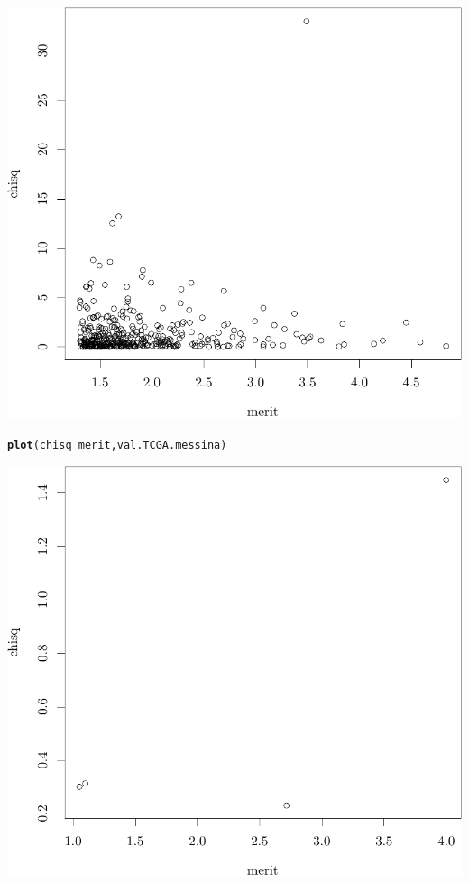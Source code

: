 \documentclass{article}\usepackage[]{graphicx}\usepackage[]{color}
\makeatletter
\def\maxwidth{ %
  \ifdim\Gin@nat@width>\linewidth
    \linewidth
  \else
    \Gin@nat@width
  \fi
}
\newcommand{\hlopt}[1]{\textcolor[rgb]{0,0,0}{#1}}%
\newcommand{\hlstd}[1]{\textcolor[rgb]{0.345,0.345,0.345}{#1}}%
\newcommand{\hlkwd}[1]{\textcolor[rgb]{0.737,0.353,0.396}{\textbf{#1}}}%
\newenvironment{kframe}{%
 \def\at@end@of@kframe{}%
 \ifinner\ifhmode%
  \def\at@end@of@kframe{\end{minipage}}%
  \begin{minipage}{\columnwidth}%
 \fi\fi%
 \def\FrameCommand##1{\hskip\@totalleftmargin \hskip-\fboxsep
 \colorbox{shadecolor}{##1}\hskip-\fboxsep
     \hskip-\linewidth \hskip-\@totalleftmargin \hskip\columnwidth}%
 \MakeFramed {\advance\hsize-\width
   \@totalleftmargin\z@ \linewidth\hsize
   \@setminipage}}%
 {\par\unskip\endMakeFramed%
 \at@end@of@kframe}
\newenvironment{knitrout}{}{} %
\makeatother
\begin{document}
\begin{knitrout}
{\centering \includegraphics[width=\maxwidth]{figure/07-E3-E3-val-1} 

}


\begin{kframe}\begin{alltt}
\hlkwd{plot}\hlstd{(chisq} \hlopt{~} \hlstd{merit, val.TCGA.messina)}
\end{alltt}
\end{kframe}

{\centering \includegraphics[width=\maxwidth]{figure/07-E3-E3-val-2} 

}
\end{knitrout}
\end{document}
